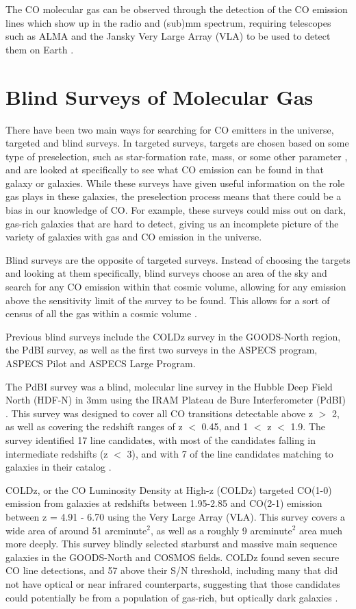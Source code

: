 \documentclass[twoside,single]{lion-msc}
\begin{document}
The CO molecular gas can be observed through the detection of the CO emission lines which show up in the radio and (sub)mm spectrum, requiring telescopes such as ALMA and the Jansky Very Large Array (VLA) to be used to detect them on Earth \cite{decarli2019alma}. 

\section{Blind Surveys of Molecular Gas}

There have been two main ways for searching for CO emitters in the universe, targeted and blind surveys. In targeted surveys, targets are chosen based on some type of preselection, such as star-formation rate, mass, or some other parameter \cite{tacconi2018phibss}, and are looked at specifically to see what CO emission can be found in that galaxy or galaxies. While these surveys have given useful information on the role gas plays in these galaxies, the preselection process means that there could be a bias in our knowledge of CO. For example, these surveys could miss out on dark, gas-rich galaxies that are hard to detect, giving us an incomplete picture of the variety of galaxies with gas and CO emission in the universe. 

Blind surveys are the opposite of targeted surveys. Instead of choosing the targets and looking at them specifically, blind surveys choose an area of the sky and search for any CO emission within that cosmic volume, allowing for any emission above the sensitivity limit of the survey to be found. This allows for a sort of census of all the gas within a cosmic volume \cite{decarli2019alma}. 

Previous blind surveys include the COLDz survey in the GOODS-North region, the PdBI survey, as well as the first two surveys in the ASPECS program, ASPECS Pilot and ASPECS Large Program.

The PdBI survey was a blind, molecular line survey in the Hubble Deep Field North (HDF-N) in 3mm using the IRAM Plateau de Bure Interferometer (PdBI) \cite{decarli2014molecular}. This survey was designed to cover all CO transitions detectable above z $>$ 2, as well as covering the redshift ranges of z $<$ 0.45, and 1 $<$ z $<$ 1.9. The survey identified 17 line candidates, with most of the candidates falling in intermediate redshifts (z $<$ 3), and with 7 of the line candidates matching to galaxies in their catalog \cite{decarli2014molecular}.

COLDz, or the CO Luminosity Density at High-z (COLDz) targeted CO(1-0) emission from galaxies at redshifts between 1.95-2.85 and CO(2-1) emission between z = 4.91 - 6.70 using the Very Large Array (VLA)\cite{pavesi2018co}. This survey covers a wide area of around 51 arcminute$^2$, as well as a roughly 9 arcminute$^2$ area much more deeply. This survey blindly selected starburst and massive main sequence galaxies in the GOODS-North and COSMOS fields. COLDz found seven secure CO line detections, and 57 above their S/N threshold, including many that did not have optical or near infrared counterparts, suggesting that those candidates could potentially be from a population of gas-rich, but optically dark galaxies \cite{pavesi2018co}.
\end{document}

